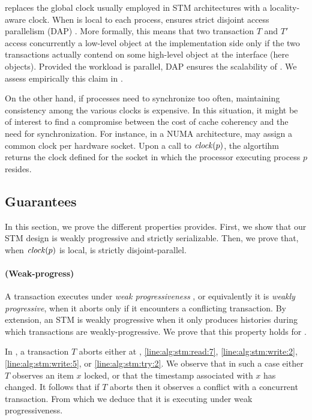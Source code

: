  replaces the global clock usually employed in STM architectures with a locality-aware clock.
When  is local to each process,  ensures strict disjoint access parallelism (DAP) \cite{Attiya2015}.
More formally, this means that two transaction $T$ and $T'$ access concurrently a low-level object at the implementation side only if the two transactions actually contend on some high-level object at the interface (here objects).
Provided the workload is parallel, DAP ensures the scalability of .
We assess empirically this claim in .

On the other hand, if processes need to synchronize too often, maintaining consistency among the various clocks is expensive.
In this situation, it might be of interest to find a compromise between the cost of cache coherency and the need for synchronization.
For instance, in a NUMA architecture,  may assign a common clock per hardware socket.
Upon a call to $\clockOf{p}$, the algortihm returns the clock defined for the socket in which the processor executing process $p$ resides.

\subsection{Guarantees}

In this section, we prove the different properties  provides.
First, we show that our STM design is weakly progressive and strictly serializable.
Then, we prove that, when $\clockOf{p}$ is local,  is strictly disjoint-parallel.

\paragraph{(Weak-progress)}
A transaction executes under \emph{weak progressiveness} \cite{Guerraoui:2009}, or equivalently it is \emph{weakly progressive}, when it aborts only if it encounters a conflicting transaction.
By extension, an STM is weakly progressive when it only produces histories during which transactions are weakly-progressive.
We prove that this property holds for .

In , a transaction $T$ aborts either at , \ref{line:alg:stm:read:7}, \ref{line:alg:stm:write:2}, \ref{line:alg:stm:write:5}, or \ref{line:alg:stm:try:2}.
We observe that in such a case either $T$ observes an item $x$ locked, or that the timestamp associated with $x$ has changed.
It follows that if $T$ aborts then it observes a conflict with a concurrent transaction.
From which we deduce that it is executing under weak progressiveness.

